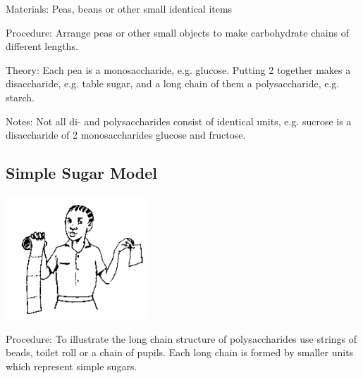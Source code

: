 \begin{multicols}{2}
\begin{description*}
\item[Materials:]{Peas, beans or other small identical items}
\item[Procedure:]{Arrange peas or other small objects to make carbohydrate chains of different lengths.}
\item[Theory:]{Each pea is a monosaccharide,
e.g. glucose. Putting 2 together
makes a disaccharide, e.g. table
sugar, and a long chain of them a
polysaccharide, e.g. starch. 
}
\item[Notes:]{Not all di- and
polysaccharides consist of
identical units, e.g. sucrose is a
disaccharide of 2 monosaccharides
glucose and fructose.}
\end{description*}

\subsection{Simple Sugar Model} %

\begin{center}
\includegraphics[width=0.4\textwidth]{./img/source/sugar-model.png}
\end{center}

\begin{description*}
\item[Procedure:]{To illustrate the long chain structure of polysaccharides use strings of beads, toilet roll or a
chain of pupils. Each long chain is formed by smaller units which represent simple sugars.}
\end{description*}


\end{multicols}
